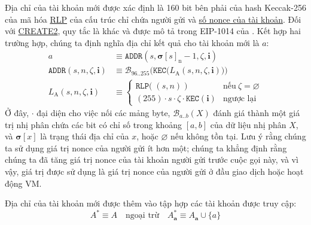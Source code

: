 \documentclass[9pt,oneside]{amsart}
\begin{document}
\begin{multicols}{2}
Địa chỉ của tài khoản mới được xác định là 160 bit bên phải của hash Keccak-256 của mã hóa \hyperlink{rlp}{RLP} của cấu trúc chỉ chứa người gửi và \hyperlink{account_nonce}{số nonce của tài khoản}.
Đối với {\small \hyperlink{create2}{CREATE2}}, quy tắc là khác và được mô tả trong EIP-1014 của \cite{EIP-1014}.
Kết hợp hai trường hợp, chúng ta định nghĩa địa chỉ kết quả cho tài khoản mới là $a$:
\begin{align}
a & \equiv \mathtt{ADDR}(s, \boldsymbol{\sigma}[s]_{\mathrm{n}} - 1, \zeta, \mathbf{i}) \\
\label{eq:new-address} \mathtt{ADDR}(s, n, \zeta, \mathbf{i}) & \equiv \mathcal{B}_{96..255}\Big(\mathtt{KEC}\big( L_{\mathrm{A}}(s, n, \zeta, \mathbf{i})\big) \Big) \\
L_{\mathrm{A}}(s, n, \zeta, \mathbf{i}) & \equiv \begin{cases}
\mathtt{RLP}\big(\;(s, n)\;\big) & \text{nếu}\ \zeta = \varnothing \\
(255) \cdot s \cdot \zeta \cdot \mathtt{KEC}(\mathbf{i}) & \text{ngược lại}
\end{cases}
\end{align}
Ở đây, $\cdot$ đại diện cho việc nối các mảng byte, $\mathcal{B}_{a..b}(X)$ đánh giá thành một giá trị nhị phân chứa các bit có chỉ số trong khoảng $[a, b]$ của dữ liệu nhị phân $X$, và $\boldsymbol{\sigma}[x]$ là trạng thái địa chỉ của $x$, hoặc $\varnothing$ nếu không tồn tại. Lưu ý rằng chúng ta sử dụng giá trị nonce của người gửi ít hơn một; chúng ta khẳng định rằng chúng ta đã tăng giá trị nonce của tài khoản người gửi trước cuộc gọi này, và vì vậy, giá trị được sử dụng là giá trị nonce của người gửi ở đầu giao dịch hoặc hoạt động VM.

Địa chỉ của tài khoản mới được thêm vào tập hợp các tài khoản được truy cập:
\begin{equation}
A^* \equiv A \quad \text{ngoại trừ} \quad A^*_{\mathbf{a}} \equiv A_{\mathbf{a}} \cup \{a\}
\end{equation}


\end{multicols}
\end{document}
